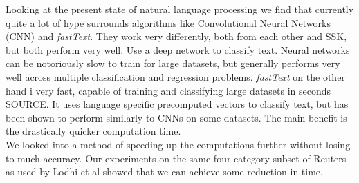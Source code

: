 Looking at the present state of natural language processing we find that currently quite a lot of hype surrounds algorithms like Convolutional Neural Networks (CNN) and \textit{fastText}. They work very differently, both from each other and SSK, but both perform very well. Use a deep network to classify text. Neural networks can be notoriously slow to train for large datasets, but generally performs very well across multiple classification and regression problems. \textit{fastText} on the other hand i very fast, capable of training and classifying large datasets in seconds SOURCE. It uses language specific precomputed vectors to classify text, but has been shown to perform similarly to CNNs on some datasets. The main benefit is the drastically quicker computation time.
\\
We looked into a method of speeding up the computations further without losing to much accuracy. Our experiments on the same four category subset of Reuters as used by Lodhi et al showed that we can achieve some reduction in time.
